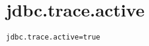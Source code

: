 \section{jdbc.trace.active}
\label{configuration:JdbcTraceActive}
\AvailableInJavaOnly{\TODO}
\begin{lstlisting}[style=Props,caption={Usage example for \textit{jdbc.trace.active}}]
jdbc.trace.active=true
\end{lstlisting}